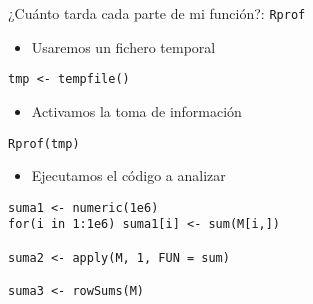 \documentclass[xcolor={usenames,svgnames,dvipsnames}]{beamer}
\begin{document}
\begin{frame}[label={sec:orge200a18},fragile]{¿Cuánto tarda cada parte de mi función?: \texttt{Rprof}}
 \begin{itemize}
\item Usaremos un fichero temporal
\end{itemize}
\lstset{language=r,label= ,caption= ,captionpos=b,numbers=none}
\begin{lstlisting}
tmp <- tempfile()
\end{lstlisting}

\begin{itemize}
\item Activamos la toma de información
\end{itemize}
\lstset{language=r,label= ,caption= ,captionpos=b,numbers=none}
\begin{lstlisting}
Rprof(tmp)
\end{lstlisting}

\begin{itemize}
\item Ejecutamos el código a analizar
\end{itemize}
\lstset{language=r,label= ,caption= ,captionpos=b,numbers=none}
\begin{lstlisting}
suma1 <- numeric(1e6)
for(i in 1:1e6) suma1[i] <- sum(M[i,])

suma2 <- apply(M, 1, FUN = sum)

suma3 <- rowSums(M)
\end{lstlisting}
\end{frame}
\end{document}
